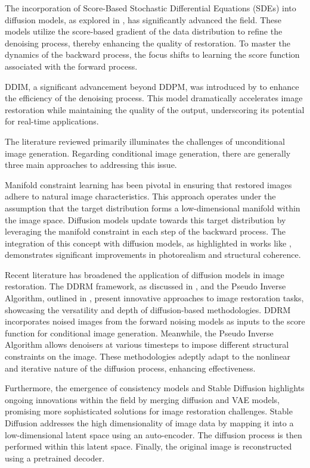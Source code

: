 \begin{survey}
The incorporation of Score-Based Stochastic Differential Equations (SDEs) into diffusion models, as explored in \cite{score_based_SDE,song_2,Anderson1982ReversetimeDE}, has significantly advanced the field. These models utilize the score-based gradient of the data distribution to refine the denoising process, thereby enhancing the quality of restoration. To master the dynamics of the backward process, the focus shifts to learning the score function associated with the forward process.

DDIM, a significant advancement beyond DDPM, was introduced by \cite{DDIM} to enhance the efficiency of the denoising process. This model dramatically accelerates image restoration while maintaining the quality of the output, underscoring its potential for real-time applications.

The literature reviewed primarily illuminates the challenges of unconditional image generation. Regarding conditional image generation, there are generally three main approaches to addressing this issue.


Manifold constraint learning has been pivotal in ensuring that restored images adhere to natural image characteristics. This approach operates under the assumption that the target distribution forms a low-dimensional manifold within the image space. Diffusion models update towards this target distribution by leveraging the manifold constraint in each step of the backward process. The integration of this concept with diffusion models, as highlighted in works like \cite{Inverse,PnP,MCG}, demonstrates significant improvements in photorealism and structural coherence.


Recent literature has broadened the application of diffusion models in image restoration. The DDRM framework, as discussed in \cite{ddrm}, and the Pseudo Inverse Algorithm, outlined in \cite{red_diff}, present innovative approaches to image restoration tasks, showcasing the versatility and depth of diffusion-based methodologies. DDRM incorporates noised images from the forward noising models as inputs to the score function for conditional image generation. Meanwhile, the Pseudo Inverse Algorithm allows denoisers at various timesteps to impose different structural constraints on the image. These methodologies adeptly adapt to the nonlinear and iterative nature of the diffusion process, enhancing effectiveness.

Furthermore, the emergence of consistency models \cite{Consistency} and Stable Diffusion \cite{vae_model} highlights ongoing innovations within the field by merging diffusion and VAE models, promising more sophisticated solutions for image restoration challenges. Stable Diffusion addresses the high dimensionality of image data by mapping it into a low-dimensional latent space using an auto-encoder. The diffusion process is then performed within this latent space. Finally, the original image is reconstructed using a pretrained decoder. 



\end{survey}
